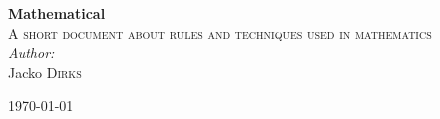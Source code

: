 \begin{titlepage}
\begin{center}
\HRule
{ \huge \bfseries Mathematical \\}
\textsc{\Large A short document about rules and techniques used in mathematics}\\[0.5cm]
\HRule
\vspace{50 mm}
\large{
\emph{Author:}\\
Jacko \textsc{Dirks}}

\vfill

{\large \today}

\end{center}
\end{titlepage}